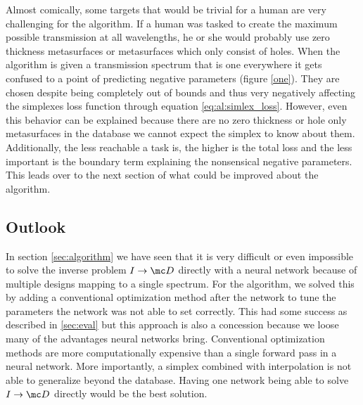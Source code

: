 \indent
Almost comically, some targets that would be trivial for a human are very challenging for the algorithm. If a human was tasked to create the maximum possible transmission at all wavelengths, he or she would probably use zero thickness metasurfaces or metasurfaces which only consist of holes. When the algorithm is given a transmission spectrum that is one everywhere it gets confused to a point of predicting negative parameters (figure \ref{one}).
They are chosen despite being completely out of bounds and thus very negatively affecting the simplexes loss function through equation \eqref{eq:al:simlex_loss}.
However, even this behavior can be explained because there are no zero thickness or hole only metasurfaces in the database we cannot expect the simplex to know about them.
Additionally, the less reachable a task is, the higher is the total loss and the less important is the boundary term explaining the nonsensical negative parameters. This leads over to the next section of what could be improved about the algorithm.
\newpage

\subsection{Outlook}\label{sec:outlook}
In section \ref{sec:algorithm} we have seen that it is very difficult or even impossible to solve the inverse problem $I \rightarrow \mc D$ directly with a neural network because of multiple designs mapping to a single spectrum.
For the algorithm, we solved this by adding a conventional optimization method after the network to tune the parameters the network was not able to set correctly.
This had some success as described in \ref{sec:eval}  but this approach is also a concession because we loose many of the advantages neural networks bring. Conventional optimization methods are more computationally expensive than a single forward pass in a neural network.
More importantly, a simplex combined with interpolation is not able to generalize beyond the database.
Having one network being able to solve $I \rightarrow \mc D$ directly would be the best solution.
\\

